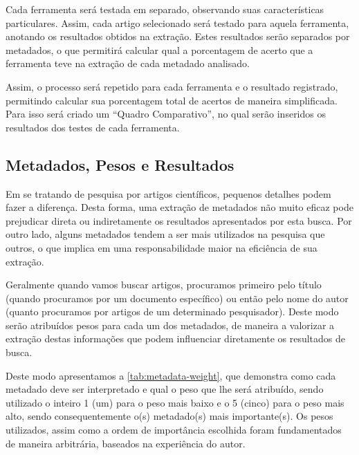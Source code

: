 Cada ferramenta será testada em separado, observando suas características particulares. Assim, cada artigo selecionado será testado para aquela ferramenta, anotando os resultados obtidos na extração. Estes resultados serão separados por metadados, o que permitirá calcular qual a porcentagem de acerto que a ferramenta teve na extração de cada metadado analisado.

Assim, o processo será repetido para cada ferramenta e o resultado registrado, permitindo calcular sua porcentagem total de acertos de maneira simplificada. Para isso será criado um ``Quadro Comparativo'', no qual serão inseridos os resultados dos testes de cada ferramenta. 

\subsection{Metadados, Pesos e Resultados}
\label{ssec:metadata-results}


Em se tratando de pesquisa por artigos científicos, pequenos detalhes podem fazer a diferença. Desta forma, uma extração de metadados não muito eficaz pode prejudicar direta ou indiretamente os resultados apresentados por esta busca. Por outro lado, alguns metadados tendem a ser mais utilizados na pesquisa que outros, o que implica em uma responsabilidade maior na eficiência de sua extração. 


Geralmente quando vamos buscar artigos, procuramos primeiro pelo título (quando procuramos por um documento específico) ou então pelo nome do autor (quanto procuramos por artigos de um determinado pesquisador). Deste modo serão atribuídos pesos para cada um dos metadados, de maneira a valorizar a extração destas informações que podem influenciar diretamente os resultados de busca.

Deste modo apresentamos a \autoref{tab:metadata-weight}, que demonstra como cada metadado deve ser interpretado e qual o peso que lhe será atribuído, sendo utilizado o inteiro 1 (um) para o peso mais baixo e o 5 (cinco) para o peso mais alto, sendo consequentemente o(s) metadado(s) mais importante(s). Os pesos utilizados, assim como a ordem de importância escolhida foram fundamentados de maneira arbitrária, baseados na experiência do autor.


